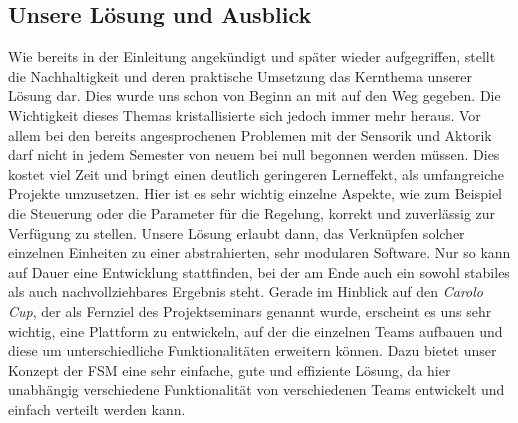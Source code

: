 \subsection{Unsere Lösung und Ausblick}
Wie bereits in der Einleitung angekündigt und später wieder aufgegriffen, stellt die Nachhaltigkeit und deren praktische Umsetzung das Kernthema unserer Lösung dar. Dies wurde uns schon von Beginn an mit auf den Weg gegeben. Die Wichtigkeit dieses Themas kristallisierte sich jedoch immer mehr heraus. Vor allem bei den bereits angesprochenen Problemen mit der Sensorik und Aktorik darf nicht in jedem Semester von neuem bei null begonnen werden müssen. Dies kostet viel Zeit und bringt einen deutlich geringeren Lerneffekt, als umfangreiche Projekte umzusetzen. Hier ist es sehr wichtig einzelne Aspekte, wie zum Beispiel die Steuerung oder die Parameter für die Regelung, korrekt und zuverlässig zur Verfügung zu stellen. Unsere Lösung erlaubt dann, das Verknüpfen solcher einzelnen Einheiten zu einer abstrahierten, sehr modularen Software. Nur so kann auf Dauer eine Entwicklung stattfinden, bei der am Ende auch ein sowohl stabiles als auch nachvollziehbares Ergebnis steht.
\newline
\newline
Gerade im Hinblick auf den \textit{Carolo Cup}, der als Fernziel des Projektseminars genannt wurde, erscheint es uns sehr wichtig, eine Plattform zu entwickeln, auf der die einzelnen Teams aufbauen  und diese um unterschiedliche Funktionalitäten erweitern können. Dazu bietet unser Konzept der FSM eine sehr einfache, gute und effiziente Lösung, da hier unabhängig verschiedene Funktionalität von verschiedenen Teams entwickelt und einfach verteilt werden kann.
